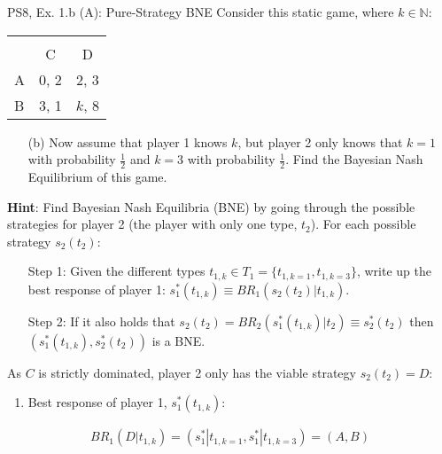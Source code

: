 \begin{frame}{PS8, Ex. 1.b (A): Pure-Strategy BNE}
    Consider this static game, where $k\in\mathbb{N}:$
    \vspace{-16pt}
    \begin{table}
      \begin{tabular}{l|c|c|}
        \multicolumn{1}{c}{} & \multicolumn{2}{c}{} \\
        \multicolumn{1}{c}{} & \multicolumn{1}{c}{C} & \multicolumn{1}{c}{D} \\\cline{2-3}
        A & 0, 2 & 2, 3 \\\cline{2-3}
        B & 3, 1 & $k$, 8 \\\cline{2-3}
      \end{tabular}
    \end{table}
    \vspace{-4pt}
    \begin{itemize}
      \item[(b)] Now assume that player 1 knows $k$, but player 2 only knows that $k = 1$ with probability $\frac{1}{2}$ and $k = 3$ with probability $\frac{1}{2}$. Find the Bayesian Nash Equilibrium of this game.
    \end{itemize}
    \vspace{-4pt}
    \begin{multicols}{2}
      \textbf{Hint}: Find Bayesian Nash Equilibria (BNE) by going through the possible strategies for player 2 (the player with only one type, $t_2$). For each possible strategy $s_2(t_2)$:
      \vspace{-4pt}
      \begin{enumerate}
        \item[Step 1:] Given the different types $t_{1,k}\in T_1=\{t_{1,k=1},t_{1,k=3}\}$, write up the best response of player 1: $s_1^*(t_{1,k})\equiv BR_1\left(s_2(t_2)|t_{1,k}\right)$.
        \item[Step 2:] If it also holds that $s_2(t_2)=BR_2\left(s_1^*(t_{1,k})|t_2\right)\equiv s_2^*(t_2)$ then $\left(s_1^*(t_{1,k}),s_2^*(t_2)\right)$ is a BNE.
      \end{enumerate}
      \vfill\null\columnbreak
      As $C$ is strictly dominated, player 2 only has the viable strategy $s_2(t_2)=D$:
      \begin{enumerate}\normalsize
        \item Best response of player 1, $s_1^*(t_{1,k}):$
      \end{enumerate}
      \vspace{-8pt}
      \begin{align*}
        BR_1\left(D|t_{1,k}\right)=(s_1^*|t_{1,k=1},s_1^*|t_{1,k=3})=(A,B)
      \end{align*}
      \vfill\null
    \end{multicols}
\end{frame}
